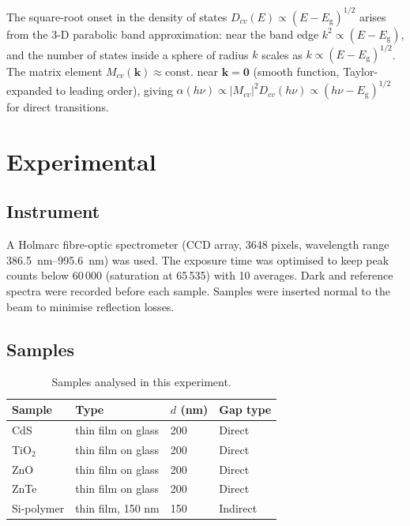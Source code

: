 \documentclass[12pt,a4paper]{article}
\newcommand{\Eg}{E_{\mathrm{g}}}
\newcommand{\hnu}{h\nu}
\begin{document}
The square-root onset in the density of states $D_{cv}(E) \propto (E-\Eg)^{1/2}$ arises
from the 3-D parabolic band approximation: near the band edge $k^2 \propto (E-\Eg)$, and
the number of states inside a sphere of radius $k$ scales as $k \propto (E-\Eg)^{1/2}$.
The matrix element $M_{cv}(\mathbf{k}) \approx \text{const.}$ near $\mathbf{k}=\mathbf{0}$
(smooth function, Taylor-expanded to leading order), giving $\alpha(\hnu) \propto |M_{cv}|^2
D_{cv}(\hnu) \propto (\hnu - \Eg)^{1/2}$ for direct transitions.

\section{Experimental}

\subsection{Instrument}

A Holmarc fibre-optic spectrometer (CCD array, 3648 pixels, wavelength range
\SIrange{386.5}{995.6}{nm}) was used.  The exposure time was optimised to keep peak
counts below 60\,000 (saturation at 65\,535) with 10 averages.  Dark and reference
spectra were recorded before each sample.  Samples were inserted normal to the beam
to minimise reflection losses.

\subsection{Samples}

\begin{table}[h]
  \centering
  \caption{Samples analysed in this experiment.}
  \label{tab:samples}
  \begin{tabular}{llll}
    \toprule
    Sample & Type & $d$ (nm) & Gap type \\
    \midrule
    CdS    & thin film on glass & 200 & Direct \\
    TiO$_2$ & thin film on glass & 200 & Direct \\
    ZnO    & thin film on glass & 200 & Direct \\
    ZnTe   & thin film on glass & 200 & Direct \\
    Si-polymer & thin film, 150 nm & 150 & Indirect \\
    \bottomrule
  \end{tabular}
\end{table}
\end{document}
